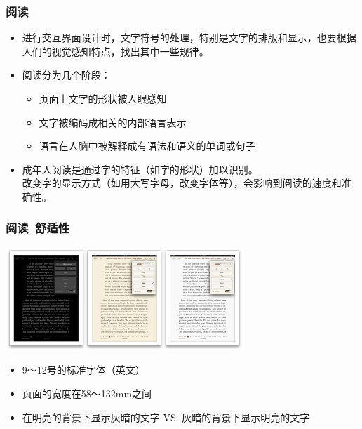 \documentclass{beamer}
\begin{document}
\begin{frame}
	\frametitle{阅读}
	\beamertemplatetransparentcovereddynamicmedium
	\begin{itemize}
		\item 进行交互界面设计时，文字符号的处理，特别是文字的排版和显示，也要根据人们的视觉感知特点，找出其中一些规律。\pause
		\item 阅读分为几个阶段：
		\begin{itemize}
			\item 页面上文字的形状被人眼感知
			\item 文字被编码成相关的内部语言表示
			\item 语言在人脑中被解释成有语法和语义的单词或句子
		\end{itemize}\pause
		\item 成年人阅读是通过字的特征（如字的形状）加以识别。\\{\tiny 改变字的显示方式（如用大写字母，改变字体等），会影响到阅读的速度和准确性。}
	\end{itemize}
\end{frame}

\begin{frame}
	\frametitle{阅读~{\small 舒适性}}
	\beamertemplatetransparentcovereddynamicmedium
	\begin{center}
		\includegraphics[width=9cm]{images/ibooks-themes.jpg}
	\end{center}
	\begin{itemize}
		\item 9～12号的标准字体（英文）\pause
		\item 页面的宽度在58～132mm之间\pause
		\item 在明亮的背景下显示灰暗的文字 VS. 灰暗的背景下显示明亮的文字
	\end{itemize}
\end{frame}
\end{document}
